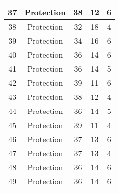 \documentclass[results.tex]{subfiles}
\begin{document}
\begin{center}
\begin{tabular}{| c || c | c | c | c |}
            \hline
            37                      & Protection                   & 38                     & 12                      & 6                    \\
            \hline
            38                      & Protection                   & 32                     & 18                      & 4                    \\
            \hline
            39                      & Protection                   & 34                     & 16                      & 6                    \\
            \hline
            40                      & Protection                   & 36                     & 14                      & 6                    \\
            \hline
            41                      & Protection                   & 36                     & 14                      & 5                    \\
            \hline
            42                      & Protection                   & 39                     & 11                      & 6                    \\
            \hline
            43                      & Protection                   & 38                     & 12                      & 4                    \\
            \hline
            44                      & Protection                   & 36                     & 14                      & 5                    \\
            \hline
            45                      & Protection                   & 39                     & 11                      & 4                    \\
            \hline
            46                      & Protection                   & 37                     & 13                      & 6                    \\
            \hline
            47                      & Protection                   & 37                     & 13                      & 4                    \\
            \hline
            48                      & Protection                   & 36                     & 14                      & 6                    \\
            \hline
            49                      & Protection                   & 36                     & 14                      & 6                    \\
            \hline
        \end{tabular}
    \end{center}
\end{document}
